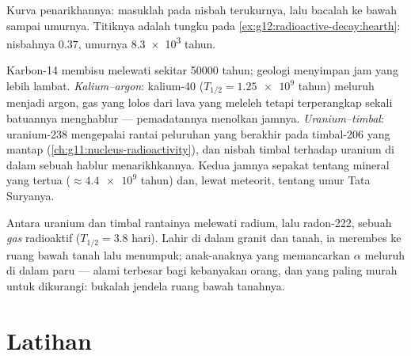 \begin{omfigure}

{\small Kurva penarikhannya: masuklah pada nisbah terukurnya, lalu bacalah ke bawah
sampai umurnya. Titiknya adalah tungku pada \cref{ex:g12:radioactive-decay:hearth}:
nisbahnya $0.37$, umurnya \num{8.3e3} tahun.}
\end{omfigure}

\begin{example}\label{ex:g12:radioactive-decay:rocks}
Karbon-14 membisu melewati sekitar \num{50000} tahun; geologi menyimpan jam yang
lebih lambat. \emph{Kalium--argon}: kalium-40 ($T_{1/2} = \num{1.25e9}$
tahun) meluruh menjadi argon, gas yang lolos dari lava yang meleleh tetapi terperangkap sekali
batuannya menghablur --- pemadatannya menolkan jamnya. \emph{Uranium--timbal}:
uranium-238 mengepalai rantai peluruhan yang berakhir pada timbal-206 yang mantap
(\cref{ch:g11:nucleus-radioactivity}), dan nisbah timbal terhadap uranium di dalam
sebuah hablur menarikhkannya. Kedua jamnya sepakat tentang mineral yang tertua
($\approx \num{4.4e9}$ tahun) dan, lewat meteorit, tentang umur Tata
Suryanya.
\end{example}

\begin{remark}\label{rem:g12:radioactive-decay:radon}
Antara uranium dan timbal rantainya melewati radium, lalu radon-222,
sebuah \emph{gas} radioaktif ($T_{1/2} = 3.8$ hari). Lahir di dalam granit dan
tanah, ia merembes ke ruang bawah tanah lalu menumpuk; anak-anaknya yang memancarkan
$\alpha$ meluruh di dalam paru ---  alami terbesar bagi kebanyakan orang, dan
yang paling murah untuk dikurangi: bukalah jendela ruang bawah tanahnya.
\end{remark}

\section{Latihan}

